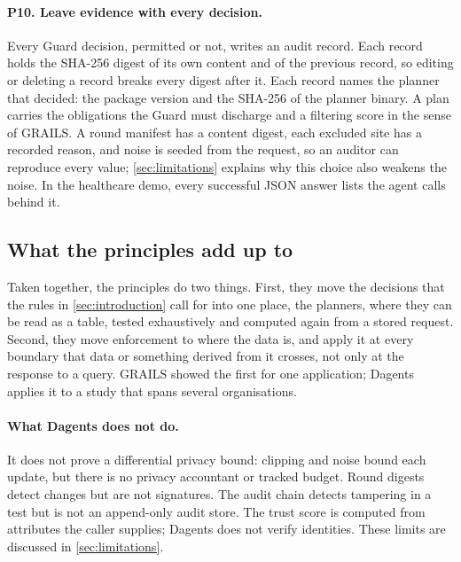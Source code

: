 \paragraph{P10. Leave evidence with every decision.} Every Guard decision,
permitted or not, writes an audit record. Each record holds the SHA-256 digest
of its own content and of the previous record, so editing or deleting a record
breaks every digest after it. Each record names the planner that decided: the
package version and the SHA-256 of the planner binary. A plan carries the
obligations the Guard must discharge and a filtering score in the sense of
GRAILS. A round manifest has a content digest, each excluded site has a recorded
reason, and noise is seeded from the request, so an auditor can reproduce every
value; \cref{sec:limitations} explains why this choice also weakens the noise. In the healthcare demo, every successful JSON answer lists the agent
calls behind it.

\subsection{What the principles add up to}

Taken together, the principles do two things. First, they move the decisions
that the rules in \cref{sec:introduction} call for into one place, the
planners, where they can be read as a table, tested exhaustively and computed
again from a stored request. Second, they move enforcement to where the data
is, and apply it at every boundary that data or something derived from it
crosses, not only at the response to a query. GRAILS showed the first for one
application; Dagents applies it to a study that spans several organisations.

\paragraph{What Dagents does not do.} It does not prove a differential privacy
bound: clipping and noise bound each update, but there is no privacy accountant
or tracked budget. Round digests detect changes but are not signatures. The
audit chain detects tampering in a test but is not an append-only audit store.
The trust score is computed from attributes the caller supplies; Dagents does
not verify identities. These limits are discussed in \cref{sec:limitations}.
